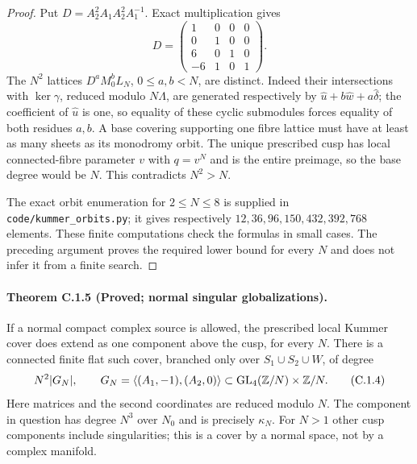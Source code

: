 \begin{proof}
Put $D=A_2^2A_1A_2^2A_1^{-1}$. Exact multiplication gives
\[
 D=\begin{pmatrix}1&0&0&0\\0&1&0&0\\6&0&1&0\\-6&1&0&1\end{pmatrix}.
\]
The $N^2$ lattices $D^aM_0^bL_N$, $0\leq a,b<N$, are distinct.
Indeed their intersections with $\ker\gamma$, reduced modulo $N\Lambda$,
are generated respectively by
$\widehat u+b\widehat w+a\widehat\delta$; the coefficient of
$\widehat u$ is one, so equality of these cyclic submodules forces
equality of both residues $a,b$. A base covering supporting one fibre
lattice must have at least as many sheets as its monodromy orbit.
The unique prescribed cusp has local connected-fibre parameter $v$
with $q=v^N$ and is the entire preimage, so the base degree would be
$N$. This contradicts $N^2>N$.

The exact orbit enumeration for $2\leq N\leq8$ is supplied in
\texttt{code/kummer\_orbits.py}; it gives respectively
$12,36,96,150,432,392,768$ elements. These finite computations check the
formulas in small cases. The preceding argument proves the required
lower bound for every $N$ and does not infer it from a finite search.
\end{proof}

\paragraph{Theorem C.1.5 (Proved; normal singular globalizations).}
If a normal compact complex source is allowed, the prescribed local
Kummer cover does extend as one component above the cusp, for every $N$.
There is a connected finite flat such cover, branched only over
$S_1\cup S_2\cup W$, of degree
\[
 N^2|G_N|,\qquad
 G_N=\langle(A_1,-1),(A_2,0)\rangle
 \subset\operatorname{GL}_4(\mathbb Z/N)\times\mathbb Z/N.
 \tag{C.1.4}
\]
Here matrices and the second coordinates are reduced modulo $N$.
The component in question has degree $N^3$ over $N_0$ and is precisely
$\kappa_N$. For $N>1$ other cusp components include singularities;
this is a cover by a normal space, not by a complex manifold.

